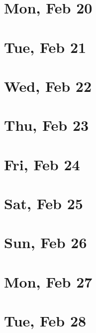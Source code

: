 	\section{Mon, Feb 20}
		
	\section{Tue, Feb 21}
		
	\section{Wed, Feb 22}
		
	\section{Thu, Feb 23}
		
	\section{Fri, Feb 24}
		
	\section{Sat, Feb 25}
		
	\section{Sun, Feb 26}
		
	\section{Mon, Feb 27}
		
	\section{Tue, Feb 28}
		
